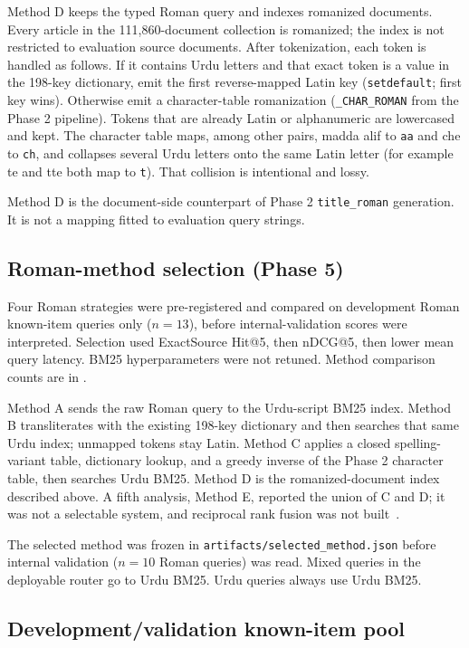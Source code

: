 \documentclass[10pt,letterpaper]{article}
\begin{document}
Method D keeps the typed Roman query and indexes romanized documents. Every article in the 111,860-document collection is romanized; the index is not restricted to evaluation source documents. After tokenization, each token is handled as follows. If it contains Urdu letters and that exact token is a value in the 198-key dictionary, emit the first reverse-mapped Latin key (\texttt{setdefault}; first key wins). Otherwise emit a character-table romanization (\texttt{\_CHAR\_ROMAN} from the Phase 2 pipeline). Tokens that are already Latin or alphanumeric are lowercased and kept. The character table maps, among other pairs, madda alif to \texttt{aa} and che to \texttt{ch}, and collapses several Urdu letters onto the same Latin letter (for example te and tte both map to \texttt{t}). That collision is intentional and lossy.

Method D is the document-side counterpart of Phase 2 \texttt{title\_roman} generation. It is not a mapping fitted to evaluation query strings.

\subsection*{Roman-method selection (Phase 5)}

Four Roman strategies were pre-registered and compared on development Roman known-item queries only ($n = 13$), before internal-validation scores were interpreted. Selection used ExactSource Hit@5, then nDCG@5, then lower mean query latency. BM25 hyperparameters were not retuned. Method comparison counts are in .

Method A sends the raw Roman query to the Urdu-script BM25 index. Method B transliterates with the existing 198-key dictionary and then searches that same Urdu index; unmapped tokens stay Latin. Method C applies a closed spelling-variant table, dictionary lookup, and a greedy inverse of the Phase 2 character table, then searches Urdu BM25. Method D is the romanized-document index described above. A fifth analysis, Method E, reported the union of C and D; it was not a selectable system, and reciprocal rank fusion was not built~\cite{bib15}.

The selected method was frozen in \texttt{artifacts/selected\_method.json} before internal validation ($n = 10$ Roman queries) was read. Mixed queries in the deployable router go to Urdu BM25. Urdu queries always use Urdu BM25.

\subsection*{Development/validation known-item pool}
\end{document}
